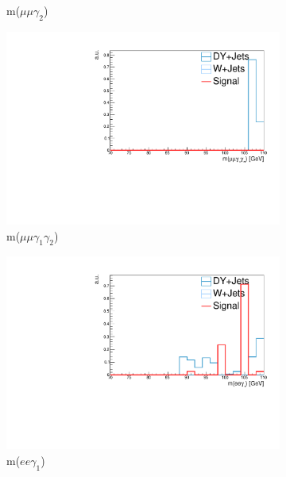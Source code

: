 \begin{figure}[htb!]
\begin{subfigure}[h]{.32\linewidth}
		\caption{m($\mu\mu\gamma_2$)}
	\end{subfigure}
	\begin{subfigure}[h]{.32\linewidth}
		\centering
		\includegraphics[width=\linewidth]{figs/05_analysis/2018_ZX_mass_MU_preFSR_mx20_comp.pdf}
		\caption{m($\mu\mu\gamma_1\gamma_2$)}
	\end{subfigure}
	\begin{subfigure}[h]{.32\linewidth}
		\centering
		\includegraphics[width=\linewidth]{figs/05_analysis/2018_ZX_Zg1_mass_ELE_preFSR_mx20_comp.pdf}
		\caption{m($ee\gamma_1$)}
	\end{subfigure}
	\begin{subfigure}[h]{.32\linewidth}
		\centering

\end{subfigure}
\end{figure}
